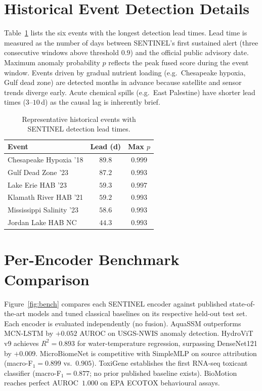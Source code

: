 \documentclass{article}
\begin{document}
\section{Historical Event Detection Details}
\label{app:events}

Table~\ref{tab:events} lists the six events with the longest detection lead times. Lead time is measured as the number of days between SENTINEL's first sustained alert (three consecutive windows above threshold $0.9$) and the official public advisory date. Maximum anomaly probability $p$ reflects the peak fused score during the event window. Events driven by gradual nutrient loading (e.g.\ Chesapeake hypoxia, Gulf dead zone) are detected months in advance because satellite and sensor trends diverge early. Acute chemical spills (e.g.\ East Palestine) have shorter lead times ($3$--$10$\,d) as the causal lag is inherently brief.

\begin{table}[ht]
\caption{Representative historical events with SENTINEL detection lead times.}
\label{tab:events}
\centering
\small
\begin{tabular}{lcc}
\toprule
\textbf{Event} & \textbf{Lead (d)} & \textbf{Max $p$} \\
\midrule
Chesapeake Hypoxia '18 & $89.8$ & $0.999$ \\
Gulf Dead Zone '23 & $87.2$ & $0.993$ \\
Lake Erie HAB '23 & $59.3$ & $0.997$ \\
Klamath River HAB '21 & $59.2$ & $0.993$ \\
Mississippi Salinity '23 & $58.6$ & $0.993$ \\
Jordan Lake HAB NC & $44.3$ & $0.993$ \\
\bottomrule
\end{tabular}
\end{table}

\section{Per-Encoder Benchmark Comparison}
\label{app:benchmarks}

Figure~\ref{fig:bench} compares each SENTINEL encoder against published state-of-the-art models and tuned classical baselines on its respective held-out test set. Each encoder is evaluated independently (no fusion). AquaSSM outperforms MCN-LSTM by $+0.052$ AUROC on USGS-NWIS anomaly detection. HydroViT v9 achieves $R^2\!=\!0.893$ for water-temperature regression, surpassing DenseNet121 by $+0.009$. MicroBiomeNet is competitive with SimpleMLP on source attribution (macro-F$_1\!=\!0.899$ vs.\ $0.905$). ToxiGene establishes the first RNA-seq toxicant classifier (macro-F$_1\!=\!0.877$; no prior published baseline exists). BioMotion reaches perfect AUROC~$1.000$ on EPA ECOTOX behavioural assays.
\end{document}

